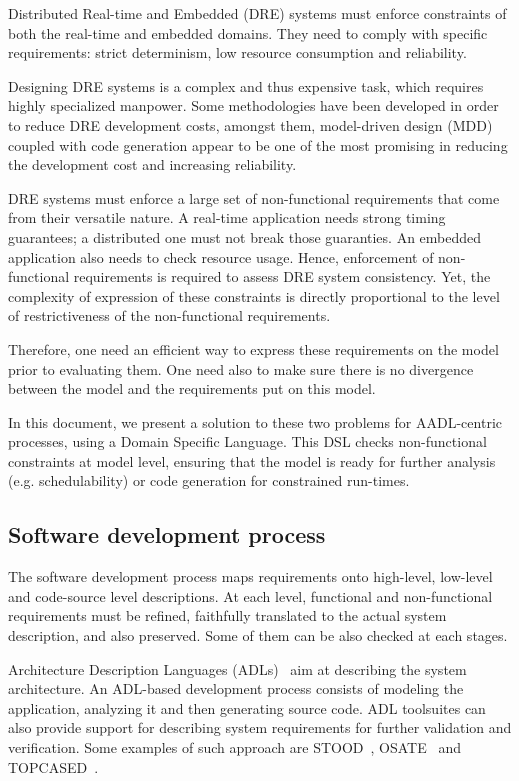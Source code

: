 \documentclass[a4paper,10pt]{article}
\begin{document}
Distributed Real-time and Embedded (DRE) systems must enforce
constraints of both the real-time and embedded domains. They need to
comply with specific requirements: strict determinism, low resource
consumption and reliability.

Designing DRE systems is a complex and thus expensive task, which
requires highly specialized manpower. Some methodologies have been
developed in order to reduce DRE development costs, amongst them,
model-driven design (MDD) coupled with code generation appear to be
one of the most promising in reducing the development cost and
increasing reliability.

DRE systems must enforce a large set of non-functional requirements
that come from their versatile nature. A real-time application needs
strong timing guarantees; a distributed one must not break those
guaranties. An embedded application also needs to check resource
usage. Hence, enforcement of non-functional requirements is required
to assess DRE system consistency. Yet, the complexity of expression 
of these constraints is directly proportional to the level of
restrictiveness of the non-functional requirements.

Therefore, one need an efficient way to express these requirements on
the model prior to evaluating them. One need also to make sure there
is no divergence between the model and the requirements put on this
model.

In this document, we present a solution to these two problems for
AADL-centric processes, using a Domain Specific Language. This DSL
checks non-functional constraints at model level, ensuring that the
model is ready for further analysis (e.g. schedulability) or code
generation for constrained run-times.

\subsection{Software development process}

The software development process maps requirements onto high-level,
low-level and code-source level descriptions. At each level,
functional and non-functional requirements must be refined, faithfully
translated to the actual system description, and also preserved. Some
of them can be also checked at each stages.

Architecture Description Languages (ADLs)~\cite{medvidovic97framework}
aim at describing the system architecture. An ADL-based development
process consists of modeling the application, analyzing it and then
generating source code. ADL toolsuites can also provide support for
describing system requirements for further validation and
verification. Some examples of such approach are STOOD~\cite{stood},
OSATE~\cite{osate} and TOPCASED~\cite{topcased}.
\end{document}
